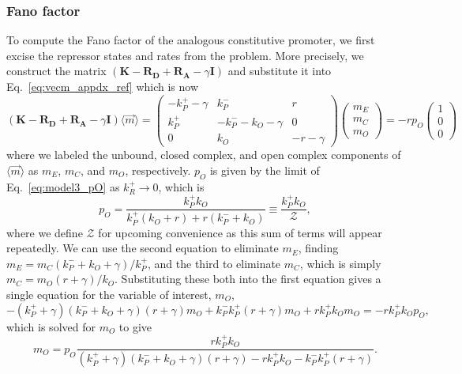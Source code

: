\subsubsection{Fano factor}
To compute the Fano factor of the analogous constitutive promoter, we first
excise the repressor states and rates from the problem. More precisely, we
construct the matrix $(\mathbf{K} - \mathbf{R_D} + \mathbf{R_A} -
\gamma\mathbf{I})$ and substitute it into Eq.~\ref{eq:vecm_appdx_ref} which is
now
\begin{equation}
(\mathbf{K} - \mathbf{R_D} + \mathbf{R_A} - \gamma\mathbf{I})
    \langle\vec{m}\rangle
= \begin{pmatrix}
    -k_P^+ - \gamma & k_P^- & r \\
     k_P^+ & -k_P^- - k_O - \gamma & 0 \\
     0 & k_O & - r- \gamma
\end{pmatrix}
\begin{pmatrix} m_E \\ m_C \\ m_O \end{pmatrix}
= -r p_O \begin{pmatrix}1 \\ 0 \\ 0 \end{pmatrix}
\end{equation}
where we labeled the unbound, closed complex, and open complex components of
$\langle\vec{m}\rangle$ as $m_E$, $m_C$, and $m_O$, respectively. $p_O$ is given
by the limit of Eq.~\ref{eq:model3_pO} as $k_R^+\rightarrow 0$, which is
\begin{equation}
p_O = \frac{k_P^+  k_O}{k_P^+ (k_O + r) + r (k_P^- + k_O)}
\equiv \frac{k_P^+  k_O}{\mathcal{Z}},
\end{equation}
where we define $\mathcal{Z}$ for upcoming convenience as this sum of terms will
appear repeatedly. We can use the second equation to eliminate $m_E$, finding
$m_E = m_C(k_P^- + k_O + \gamma)/k_P^+$, and the third to eliminate $m_C$, which
is simply $m_C = m_O(r+\gamma)/k_O$. Substituting these both into the first
equation gives a single equation for the variable of interest, $m_O$,
\begin{equation}
-(k_P^+ + \gamma) (k_P^- + k_O + \gamma) (r + \gamma) m_O
    + k_P^- k_P^+ (r + \gamma) m_O + r k_P^+ k_O m_O = - r k_P^+ k_O p_O,
\end{equation}
which is solved for $m_O$ to give
\begin{equation}
m_O = p_O \frac{r k_P^+ k_O}
    {(k_P^+ + \gamma) (k_P^- + k_O + \gamma) (r + \gamma)
        -r k_P^+ k_O - k_P^- k_P^+ (r + \gamma)}.
\end{equation}
